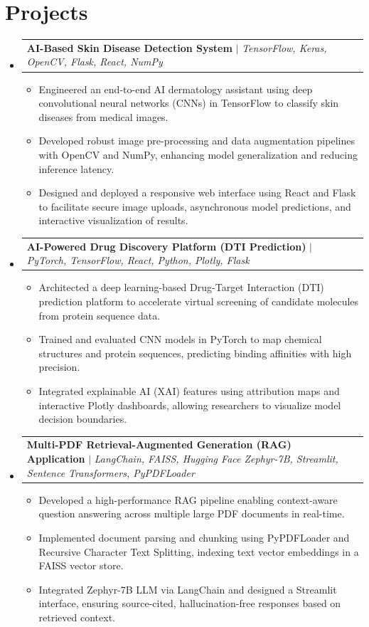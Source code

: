 \documentclass[letterpaper,10pt]{article}
\makeatletter
\newcommand{\resumeItem}[1]{
  \item\small{
    {#1 \vspace{-2pt}}
  }
}
\newcommand{\resumeProjectHeading}[2]{
    \item
    \begin{tabular*}{0.97\textwidth}{l@{\extracolsep{\fill}}r}
      \small#1 & #2 \\
    \end{tabular*}\vspace{-7pt}
}
\newcommand{\resumeSubHeadingListStart}{\begin{itemize}[leftmargin=0.15in, label={}]}
\newcommand{\resumeSubHeadingListEnd}{\end{itemize}}
\newcommand{\resumeItemListStart}{\begin{itemize}}
\newcommand{\resumeItemListEnd}{\end{itemize}\vspace{-5pt}}
\makeatother
\begin{document}
\section{Projects}
\resumeSubHeadingListStart
  \resumeProjectHeading
    {\textbf{AI-Based Skin Disease Detection System} $|$ \emph{TensorFlow, Keras, OpenCV, Flask, React, NumPy}}{}
  \resumeItemListStart
    \resumeItem{Engineered an end-to-end AI dermatology assistant using deep convolutional neural networks (CNNs) in TensorFlow to classify skin diseases from medical images.}
    \resumeItem{Developed robust image pre-processing and data augmentation pipelines with OpenCV and NumPy, enhancing model generalization and reducing inference latency.}
    \resumeItem{Designed and deployed a responsive web interface using React and Flask to facilitate secure image uploads, asynchronous model predictions, and interactive visualization of results.}
  \resumeItemListEnd
  \resumeProjectHeading
    {\textbf{AI-Powered Drug Discovery Platform (DTI Prediction)} $|$ \emph{PyTorch, TensorFlow, React, Python, Plotly, Flask}}{}
  \resumeItemListStart
    \resumeItem{Architected a deep learning-based Drug-Target Interaction (DTI) prediction platform to accelerate virtual screening of candidate molecules from protein sequence data.}
    \resumeItem{Trained and evaluated CNN models in PyTorch to map chemical structures and protein sequences, predicting binding affinities with high precision.}
    \resumeItem{Integrated explainable AI (XAI) features using attribution maps and interactive Plotly dashboards, allowing researchers to visualize model decision boundaries.}
  \resumeItemListEnd
  \resumeProjectHeading
    {\textbf{Multi-PDF Retrieval-Augmented Generation (RAG) Application} $|$ \emph{LangChain, FAISS, Hugging Face Zephyr-7B, Streamlit, Sentence Transformers, PyPDFLoader}}{}
  \resumeItemListStart
    \resumeItem{Developed a high-performance RAG pipeline enabling context-aware question answering across multiple large PDF documents in real-time.}
    \resumeItem{Implemented document parsing and chunking using PyPDFLoader and Recursive Character Text Splitting, indexing text vector embeddings in a FAISS vector store.}
    \resumeItem{Integrated Zephyr-7B LLM via LangChain and designed a Streamlit interface, ensuring source-cited, hallucination-free responses based on retrieved context.}
  \resumeItemListEnd
\resumeSubHeadingListEnd
\end{document}
